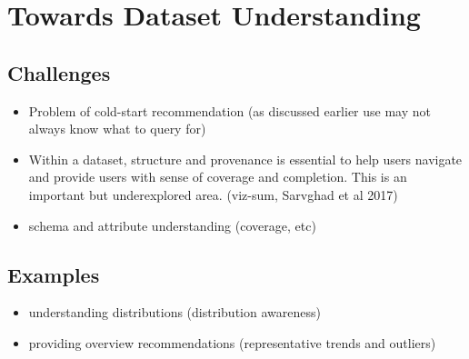 \section{Towards Dataset Understanding\label{sec:understanding}}
\subsection{Challenges}
\begin{itemize}
\item Problem of cold-start recommendation (as discussed earlier use may not always know what to query for)
\item Within a dataset, structure and provenance is essential to help users navigate and provide users with sense of coverage and completion. This is an important but underexplored area. (viz-sum, Sarvghad et al 2017)
\item schema and attribute understanding (coverage, etc) 
\end{itemize}

\subsection{Examples}
\begin{itemize}
	\item understanding distributions (distribution awareness)
	\item providing overview recommendations (representative trends and outliers)
\end{itemize}